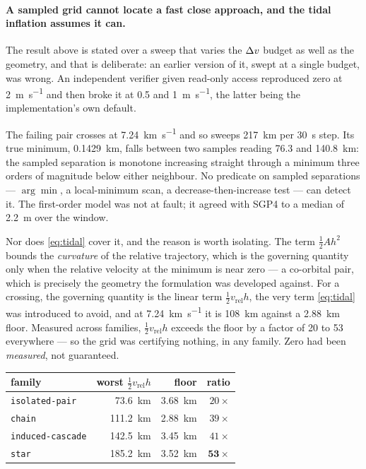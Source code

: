 \paragraph{A sampled grid cannot locate a fast close approach, and the tidal
inflation assumes it can.} The result above is stated over a sweep that varies
the $\Delta v$ budget as well as the geometry, and that is deliberate: an earlier
version of it, swept at a single budget, was wrong. An independent verifier
given read-only access reproduced zero at \SI{2}{\meter\per\second} and then
broke it at \SI{0.5}{} and \SI{1}{\meter\per\second}, the latter being the
implementation's own default.

The failing pair crosses at \SI{7.24}{\kilo\meter\per\second} and so sweeps
\SI{217}{\kilo\meter} per \SI{30}{\second} step. Its true minimum,
\SI{0.1429}{\kilo\meter}, falls between two samples reading \SI{76.3}{} and
\SI{140.8}{\kilo\meter}: the sampled separation is monotone increasing straight
through a minimum three orders of magnitude below either neighbour. No
predicate on sampled separations --- $\arg\min$, a local-minimum scan, a
decrease-then-increase test --- can detect it. The first-order model was not
at fault; it agreed with SGP4 to a median of \SI{2.2}{\meter} over the window.

Nor does \eqref{eq:tidal} cover it, and the reason is worth isolating. The term
$\tfrac12 A h^2$ bounds the \emph{curvature} of the relative trajectory, which
is the governing quantity only when the relative velocity at the minimum is
near zero --- a co-orbital pair, which is precisely the geometry the
formulation was developed against. For a crossing, the governing quantity is
the linear term $\tfrac12 v_{\text{rel}} h$, the very term \eqref{eq:tidal} was
introduced to avoid, and at \SI{7.24}{\kilo\meter\per\second} it is
\SI{108}{\kilo\meter} against a \SI{2.88}{\kilo\meter} floor. Measured across
families, $\tfrac12 v_{\text{rel}} h$ exceeds the floor by a factor of
\num{20} to \num{53} everywhere --- so the grid was certifying nothing, in any
family. Zero had been \emph{measured}, not guaranteed.

\begin{center}
\begin{tabular}{lrrr}
\toprule
family & worst $\tfrac12 v_{\text{rel}} h$ & floor & ratio \\
\midrule
\texttt{isolated-pair}   & \SI{73.6}{\kilo\meter}  & \SI{3.68}{\kilo\meter} & $20\times$ \\
\texttt{chain}           & \SI{111.2}{\kilo\meter} & \SI{2.88}{\kilo\meter} & $39\times$ \\
\texttt{induced-cascade} & \SI{142.5}{\kilo\meter} & \SI{3.45}{\kilo\meter} & $41\times$ \\
\texttt{star}            & \SI{185.2}{\kilo\meter} & \SI{3.52}{\kilo\meter} & $\mathbf{53\times}$ \\
\bottomrule
\end{tabular}
\end{center}


